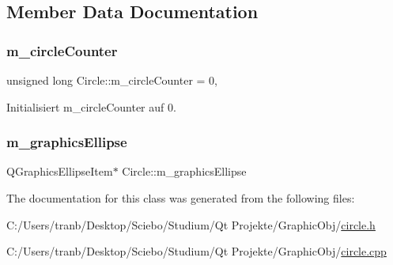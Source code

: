 \subsection{Member Data Documentation}
\mbox{\label{class_circle_a0cd7c4ac1de2acb420970134f30075b2}} 
\subsubsection{\texorpdfstring{m\+\_\+circle\+Counter}{m\_circleCounter}}
{\footnotesize\ttfamily unsigned long Circle\+::m\+\_\+circle\+Counter = 0\hspace{0.3cm}{\ttfamily [static]}, {\ttfamily [protected]}}



Initialisiert m\+\_\+circle\+Counter auf 0. 

\mbox{\label{class_circle_aad3490d575b91461697136e1cad4e6a5}} 
\subsubsection{\texorpdfstring{m\+\_\+graphics\+Ellipse}{m\_graphicsEllipse}}
{\footnotesize\ttfamily Q\+Graphics\+Ellipse\+Item$\ast$ Circle\+::m\+\_\+graphics\+Ellipse\hspace{0.3cm}{\ttfamily [protected]}}



The documentation for this class was generated from the following files\+:\begin{DoxyCompactItemize}
\item 
C\+:/\+Users/tranb/\+Desktop/\+Sciebo/\+Studium/\+Qt Projekte/\+Graphic\+Obj/\hyperlink{circle_8h}{circle.\+h}\item 
C\+:/\+Users/tranb/\+Desktop/\+Sciebo/\+Studium/\+Qt Projekte/\+Graphic\+Obj/\hyperlink{circle_8cpp}{circle.\+cpp}\end{DoxyCompactItemize}
